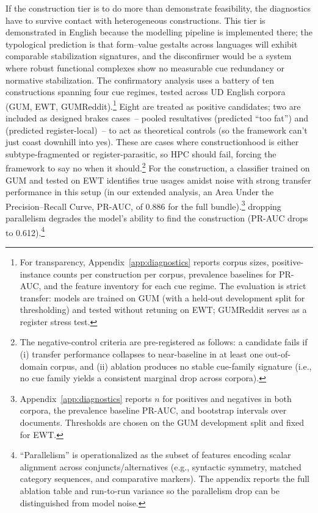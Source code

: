 If the construction tier is to do more than demonstrate feasibility, the diagnostics have to survive contact with heterogeneous constructions. This tier is demonstrated in English because the modelling pipeline is implemented there; the typological prediction is that form--value gestalts across languages will exhibit comparable stabilization signatures, and the disconfirmer would be a system where robust functional complexes show no measurable cue redundancy or normative stabilization. The confirmatory analysis uses a battery of ten constructions spanning four cue regimes, tested across UD English corpora (GUM, EWT, GUMReddit).\footnote{For transparency, Appendix~\ref{app:diagnostics} reports corpus sizes, positive-instance counts per construction per corpus, prevalence baselines for PR-AUC, and the feature inventory for each cue regime. The evaluation is strict transfer: models are trained on GUM (with a held-out development split for thresholding) and tested without retuning on EWT; GUMReddit serves as a register stress test.}
Eight are treated as positive candidates; two are included as designed brakes cases~-- pooled resultatives (predicted \enquote{too fat}) and  (predicted register-local)~-- to act as theoretical controls (so the framework can't just coast downhill into yes). These are cases where constructionhood is either subtype-fragmented or register-parasitic, so HPC should fail, forcing the framework to say no when it should.\footnote{The negative-control criteria are pre-registered as follows: a candidate fails if (i) transfer performance collapses to near-baseline in at least one out-of-domain corpus, and (ii) ablation produces no stable cue-family signature (i.e., no cue family yields a consistent marginal drop across corpora).}
For the  construction, a classifier trained on GUM and tested on EWT identifies true usages amidst noise with strong transfer performance in this setup (in our extended analysis, an Area Under the Precision--Recall Curve, PR-AUC, of 0.886 for the full bundle).\footnote{Appendix~\ref{app:diagnostics} reports $n$ for positives and negatives in both corpora, the prevalence baseline PR-AUC, and bootstrap intervals over documents. Thresholds are chosen on the GUM development split and fixed for EWT.}
dropping parallelism degrades the model's ability to find the construction (PR-AUC drops to 0.612).\footnote{\enquote{Parallelism} is operationalized as the subset of features encoding scalar alignment across conjuncts/alternatives (e.g., syntactic symmetry, matched category sequences, and comparative markers). The appendix reports the full ablation table and run-to-run variance so the parallelism drop can be distinguished from model noise.}
